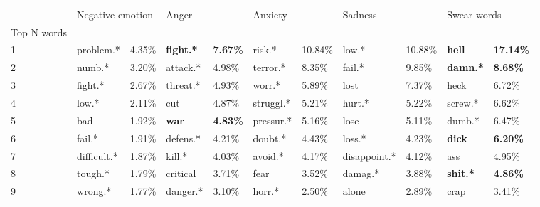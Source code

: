 \begin{tabular}{lllllllllll}
\toprule
{} & \multicolumn{2}{l}{Negative emotion} & \multicolumn{2}{l}{Anger} & \multicolumn{2}{l}{Anxiety} & \multicolumn{2}{l}{Sadness} & \multicolumn{2}{l}{Swear words} \\
Top N words          &                  &            &                   &                  &              &            &               &            &                  &                   \\
\midrule
1                    &        problem.* &     4.35\% &  \textbf{fight.*} &  \textbf{7.67\%} &       risk.* &    10.84\% &         low.* &    10.88\% &    \textbf{hell} &  \textbf{17.14\%} \\
2                    &           numb.* &     3.20\% &          attack.* &           4.98\% &     terror.* &     8.35\% &        fail.* &     9.85\% &  \textbf{damn.*} &   \textbf{8.68\%} \\
3                    &          fight.* &     2.67\% &          threat.* &           4.93\% &       worr.* &     5.89\% &          lost &     7.37\% &             heck &            6.72\% \\
4                    &            low.* &     2.11\% &               cut &           4.87\% &    struggl.* &     5.21\% &        hurt.* &     5.22\% &          screw.* &            6.62\% \\
5                    &              bad &     1.92\% &      \textbf{war} &  \textbf{4.83\%} &    pressur.* &     5.16\% &          lose &     5.11\% &           dumb.* &            6.47\% \\
6                    &           fail.* &     1.91\% &          defens.* &           4.21\% &      doubt.* &     4.43\% &        loss.* &     4.23\% &    \textbf{dick} &   \textbf{6.20\%} \\
7                    &      difficult.* &     1.87\% &            kill.* &           4.03\% &      avoid.* &     4.17\% &  disappoint.* &     4.12\% &              ass &            4.95\% \\
8                    &          tough.* &     1.79\% &          critical &           3.71\% &         fear &     3.52\% &       damag.* &     3.88\% &  \textbf{shit.*} &   \textbf{4.86\%} \\
9                    &          wrong.* &     1.77\% &          danger.* &           3.10\% &       horr.* &     2.50\% &         alone &     2.89\% &             crap &            3.41\% \\

\end{tabular}
